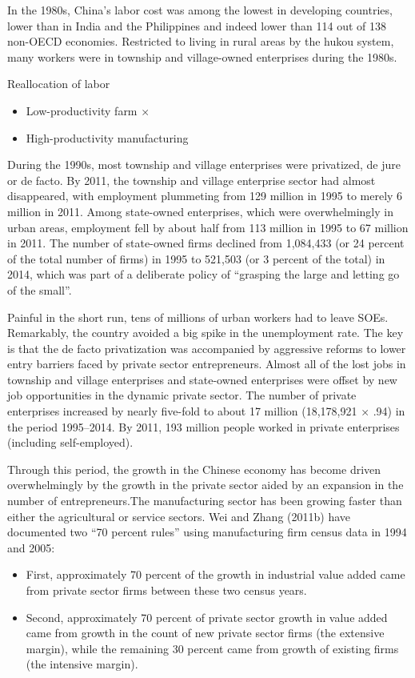 \documentclass{article}
\begin{document}
    In the 1980s, China’s labor cost was among the lowest in developing countries, lower than in India and the Philippines and indeed lower than 114 out of 138 non-OECD economies. Restricted to living in rural areas by the hukou system, many workers were in township and village-owned enterprises during the 1980s.

    Reallocation of labor
    \begin{itemize}
        \item Low-productivity farm $\times$
        \item High-productivity manufacturing \checkmark
    \end{itemize}

    During the 1990s, most township and village enterprises were privatized, de jure or de facto. By 2011, the township and village enterprise sector had almost disappeared, with employment plummeting from 129 million in 1995 to merely 6 million in 2011. Among state-owned enterprises, which were overwhelmingly in urban areas, employment fell by about half from 113 million in 1995 to 67 million in 2011. The number of state-owned firms declined from 1,084,433 (or 24 percent of the total number of firms) in 1995 to 521,503 (or 3 percent of the total) in 2014, which was part of a deliberate policy of “grasping the large and letting go of the small”.

    Painful in the short run, tens of millions of urban workers had to leave SOEs. Remarkably, the country avoided a big spike in the unemployment rate. The key is that the de facto privatization was accompanied by aggressive reforms to lower entry barriers faced by private sector entrepreneurs. Almost all of the lost jobs in township and village enterprises and state-owned enterprises were offset by new job opportunities in the dynamic private sector. The number of private enterprises increased by nearly five-fold to about 17 million (18,178,921 × .94) in the period 1995–2014. By 2011, 193 million people worked in private enterprises (including self-employed).

    Through this period, the growth in the Chinese economy has become driven overwhelmingly by the growth in the private sector aided by an expansion in the number of entrepreneurs.The manufacturing sector has been growing faster than either the agricultural or service sectors. Wei and Zhang (2011b) have documented two “70 percent rules” using manufacturing firm census data in 1994 and 2005:
    \begin{itemize}
        \item First, approximately 70 percent of the growth in industrial value added came from private sector firms between these two census years.
        \item Second, approximately 70 percent of private sector growth in value added came from growth in the count of new private sector firms (the extensive margin), while the remaining 30 percent came from growth of existing firms (the intensive margin).
    \end{itemize}
\end{document}
